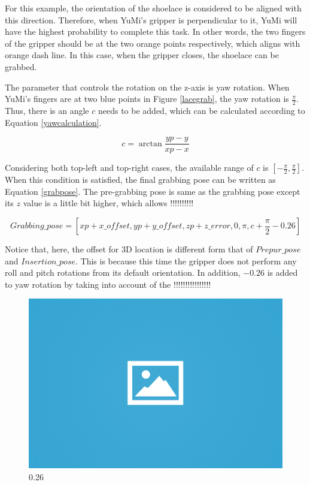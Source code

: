 For this example, the orientation of the shoelace is considered to be aligned with this direction. Therefore, when YuMi's gripper is perpendicular to it, YuMi will have the highest probability to complete this task. In other words, the two fingers of the gripper should be at the two orange points respectively, which aligns with orange dash line. In this case, when the gripper closes, the shoelace can be grabbed. 

The parameter that controls the rotation on the z-axis is yaw rotation. When YuMi's fingers are at two blue points in Figure \ref{lacegrab}, the yaw rotation is $\frac{\pi}{2}$. Thus, there is an angle $c$ needs to be added, which can be calculated according to Equation \ref{yawcalculation}.

\begin{equation}
c = \arctan \frac{yp - y}{xp - x}
\label{yawcalculation}
\end{equation}

Considering both top-left and top-right cases, the available range of $c$ is $[-\frac{\pi}{2}, \frac{\pi}{2}]$. When this condition is satisfied, the final grabbing pose can be written as Equation \ref{grabpose}. The pre-grabbing pose is same as the grabbing pose except its $z$ value is a little bit higher, which allows !!!!!!!!!!

\begin{equation}
Grabbing\_pose = [xp + x\_offset, yp + y\_offset, zp + z\_error, 0, \pi, c + \frac{\pi}{2} - 0.26]
\label{grabpose}
\end{equation}

Notice that, here, the offset for 3D location is different form that of $Prepur\_pose$ and $Insertion\_pose$. This is because this time the gripper does not perform any roll and pitch rotations from its default orientation. In addition, $-0.26$ is added to yaw rotation by taking into account of the !!!!!!!!!!!!!!!!

\begin{figure}[H]
\centering
\includegraphics[width = 0.3\columnwidth]{images/ph.png}
\caption{0.26}
\label{0.26}
\end{figure}

